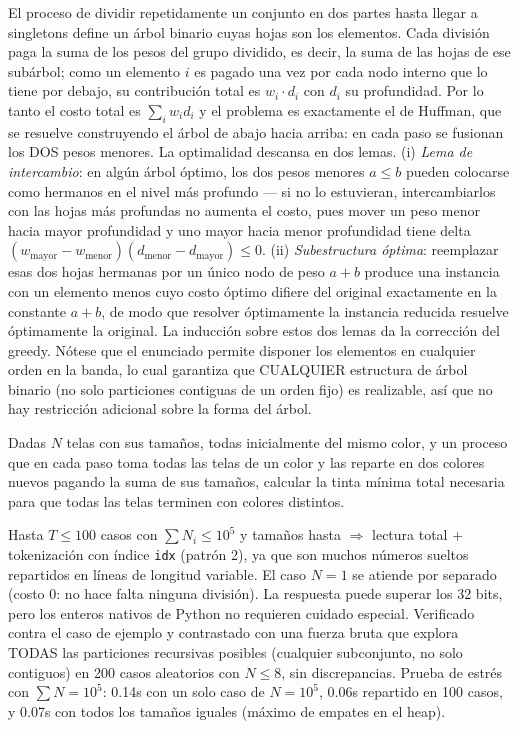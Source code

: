  El proceso de dividir repetidamente un conjunto en dos partes hasta llegar a singletons define un árbol binario cuyas hojas son los elementos. Cada división paga la suma de los pesos del grupo dividido, es decir, la suma de las hojas de ese subárbol; como un elemento $i$ es pagado una vez por cada nodo interno que lo tiene por debajo, su contribución total es $w_i \cdot d_i$ con $d_i$ su profundidad. Por lo tanto el costo total es $\sum_i w_i d_i$ y el problema es exactamente el de Huffman, que se resuelve construyendo el árbol de abajo hacia arriba: en cada paso se fusionan los DOS pesos menores. La optimalidad descansa en dos lemas. (i) \emph{Lema de intercambio}: en algún árbol óptimo, los dos pesos menores $a \le b$ pueden colocarse como hermanos en el nivel más profundo — si no lo estuvieran, intercambiarlos con las hojas más profundas no aumenta el costo, pues mover un peso menor hacia mayor profundidad y uno mayor hacia menor profundidad tiene delta $(w_{\text{mayor}} - w_{\text{menor}})(d_{\text{menor}} - d_{\text{mayor}}) \le 0$. (ii) \emph{Subestructura óptima}: reemplazar esas dos hojas hermanas por un único nodo de peso $a+b$ produce una instancia con un elemento menos cuyo costo óptimo difiere del original exactamente en la constante $a+b$, de modo que resolver óptimamente la instancia reducida resuelve óptimamente la original. La inducción sobre estos dos lemas da la corrección del greedy. Nótese que el enunciado permite disponer los elementos en cualquier orden en la banda, lo cual garantiza que CUALQUIER estructura de árbol binario (no solo particiones contiguas de un orden fijo) es realizable, así que no hay restricción adicional sobre la forma del árbol.~\cite{huffman1952}


Dadas $N$ telas con sus tamaños, todas inicialmente del mismo color, y un proceso que en cada paso toma todas las telas de un color y las reparte en dos colores nuevos pagando la suma de sus tamaños, calcular la tinta mínima total necesaria para que todas las telas terminen con colores distintos.

 Hasta $T \le 100$ casos con $\sum N_i \le 10^5$ y tamaños hasta  $\Rightarrow$ lectura total + tokenización con índice \texttt{idx} (patrón 2), ya que son muchos números sueltos repartidos en líneas de longitud variable. El caso $N=1$ se atiende por separado (costo $0$: no hace falta ninguna división). La respuesta puede superar los 32 bits, pero los enteros nativos de Python no requieren cuidado especial. Verificado contra el caso de ejemplo y contrastado con una fuerza bruta que explora TODAS las particiones recursivas posibles (cualquier subconjunto, no solo contiguos) en 200 casos aleatorios con $N \le 8$, sin discrepancias. Prueba de estrés con $\sum N = 10^5$: \aprox{}0.14s con un solo caso de $N=10^5$, \aprox{}0.06s repartido en 100 casos, y \aprox{}0.07s con todos los tamaños iguales (máximo de empates en el heap).

